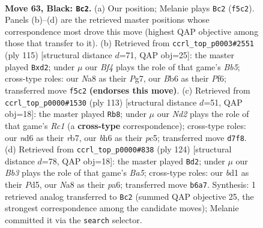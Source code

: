 \documentclass[11pt]{article}
\begin{document}
\clearpage

\begin{figure}[p]\centering
\begin{subfigure}{0.46\textwidth}\centering
\resizebox{\linewidth}{!}{%
\newchessgame
\chessboard[
  setfen={n7/3n4/1b1N2kB/p2p1b2/8/PP2P2p/4P3/3BK3 b - - 8 63},
  showmover=false,
  pgfstyle=straightmove, color=movearrow, markmove={f5-c2}
]}
\caption{}
\end{subfigure}\hfill
\begin{subfigure}{0.46\textwidth}\centering
\resizebox{\linewidth}{!}{%
\newchessgame
\chessboard[
  setfen={5k2/6p1/5p2/8/1b5p/3b3P/2nB1PP1/1N1B2K1 b - - 27 58},
  showmover=false,
  pgfstyle=straightmove, color=movearrow, markmove={b4-d2}
]}
\caption{}
\end{subfigure}
\\[4pt]
\begin{subfigure}{0.46\textwidth}\centering
\resizebox{\linewidth}{!}{%
\newchessgame
\chessboard[
  setfen={2r1k3/1R1b4/4pp2/2P1b2p/1B2P2P/3BK3/2P5/8 b - - 6 57},
  showmover=false,
  pgfstyle=straightmove, color=movearrow, markmove={c8-b8}
]}
\caption{}
\end{subfigure}\hfill
\begin{subfigure}{0.46\textwidth}\centering
\resizebox{\linewidth}{!}{%
\newchessgame
\chessboard[
  setfen={8/4k3/p2p1n2/B1pP3p/3bB3/1P3K1P/6P1/8 w - - 5 63},
  showmover=false,
  pgfstyle=straightmove, color=movearrow, markmove={a5-d2}
]}
\caption{}
\end{subfigure}
\caption{\textbf{Move 63, Black: \texttt{Bc2}.} (a) Our position; Melanie plays \texttt{Bc2} (\texttt{f5c2}). Panels (b)--(d) are the retrieved master positions whose correspondence most drove this move (highest QAP objective among those that transfer to it). (b) Retrieved from \texttt{ccrl\_top\_p0003\#2551} (ply 115) [structural distance $d$=71, QAP obj=25]: the master played \texttt{Bxd2}; under $\mu$ our \emph{Bf4} plays the role of that game's \emph{Bb5}; cross-type roles: our \emph{N}a8 as their \emph{P}g7, our \emph{B}b6 as their \emph{P}f6; transferred move \texttt{f5c2} \textbf{(endorses this move)}. (c) Retrieved from \texttt{ccrl\_top\_p0000\#1530} (ply 113) [structural distance $d$=51, QAP obj=18]: the master played \texttt{Rb8}; under $\mu$ our \emph{Nd2} plays the role of that game's \emph{Rc1} (a \textbf{cross-type} correspondence); cross-type roles: our \emph{n}d6 as their \emph{r}b7, our \emph{b}h6 as their \emph{p}c5; transferred move \texttt{d7f8}. (d) Retrieved from \texttt{ccrl\_top\_p0000\#838} (ply 124) [structural distance $d$=78, QAP obj=18]: the master played \texttt{Bd2}; under $\mu$ our \emph{Bb3} plays the role of that game's \emph{Ba5}; cross-type roles: our \emph{b}d1 as their \emph{P}d5, our \emph{N}a8 as their \emph{p}a6; transferred move \texttt{b6a7}. Synthesis: 1 retrieved analog transferred to \texttt{Bc2} (summed QAP objective 25, the strongest correspondence among the candidate moves); Melanie committed it via the \texttt{search} selector.}
\label{fig:thought-m125}
\end{figure}
\end{document}
